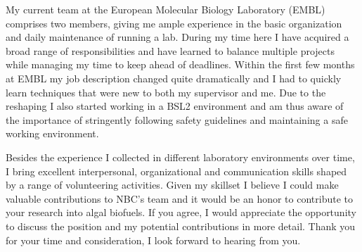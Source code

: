 \documentclass[11pt,a4paper,sans]{moderncv}
\begin{document}
\begin{spacing}{1.15}
My current team at the European Molecular Biology Laboratory (EMBL) comprises two members, giving me ample experience in the basic organization and daily maintenance of running a lab. During my time here I have acquired a broad range of responsibilities and have learned to balance multiple projects while managing my time to keep ahead of deadlines. Within the first few months at EMBL my job description changed quite dramatically and I had to quickly learn techniques that were new to both my supervisor and me. Due to the reshaping I also started working in a BSL2 environment and am thus aware of the importance of stringently following safety guidelines and maintaining a safe working environment.\par\vspace*{1mm}

Besides the experience I collected in different laboratory environments over time, I bring excellent interpersonal, organizational and communication skills shaped by a range of volunteering activities. Given my skillset I believe I could make valuable contributions to NBC's team and it would be an honor to contribute to your research into algal biofuels. If you agree, I would appreciate the opportunity to discuss the position and my potential contributions in more detail. Thank you for your time and consideration, I look forward to hearing from you.


 

\end{spacing}
\makeletterclosing
\end{document}
